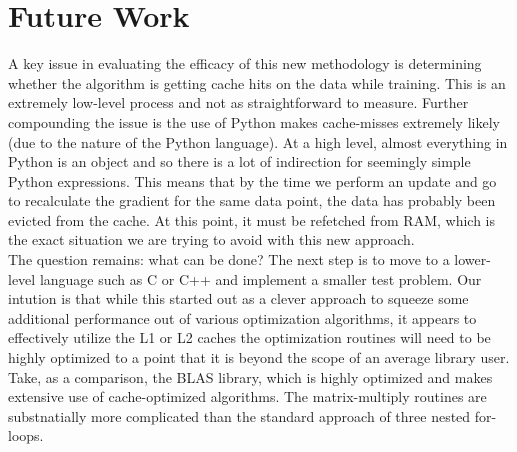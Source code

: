 \documentclass[,conference,compsoc]{IEEEtran}
\begin{document}


\section{Future Work}
A key issue in evaluating the efficacy of this new methodology is determining
whether the algorithm is getting cache hits on the data while training. This is
an extremely low-level process and not as straightforward to measure. Further
compounding the issue is the use of Python makes cache-misses extremely likely
(due to the nature of the Python language). At a high level, almost everything
in Python is an object and so there is a lot of indirection for seemingly simple
Python expressions. This means that by the time we perform an update and go to
recalculate the gradient for the same data point, the data has probably been
evicted from the cache. At this point, it must be refetched from RAM, which is
the exact situation we are trying to avoid with this new approach.\\

The question remains: what can be done? The next step is to move to a
lower-level language such as C or C++ and implement a smaller test problem. Our
intution is that while this started out as a clever approach to squeeze some
additional performance out of various optimization algorithms, it appears to
effectively utilize the L1 or L2 caches the optimization routines will need to
be highly optimized to a point that it is beyond the scope of an average
library user. Take, as a comparison, the BLAS library, which is highly optimized
and makes extensive use of cache-optimized algorithms. The matrix-multiply
routines are substnatially more complicated than the standard approach of three
nested for-loops.\\
\end{document}

